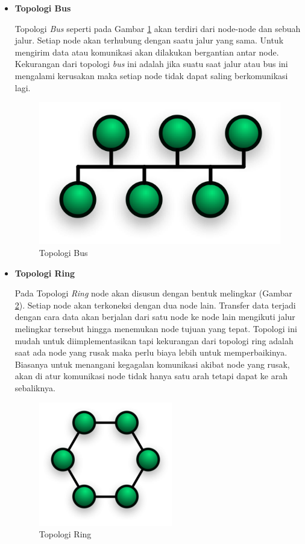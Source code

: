 \documentclass[a4paper,twoside]{article}
\begin{document}
\begin{enumerate}
\begin{itemize}
\item \textbf{Topologi Bus}

Topologi \textit{Bus} seperti pada Gambar \ref{fig:bus} akan terdiri dari node-node dan sebuah jalur. Setiap node akan terhubung dengan saatu jalur yang sama. Untuk mengirim data atau komunikasi akan dilakukan bergantian antar node. Kekurangan dari topologi \textit{bus} ini adalah jika suatu saat jalur atau bus ini mengalami kerusakan maka setiap node tidak dapat saling berkomunikasi lagi.
\begin{figure} [H]
	\centering  
	\includegraphics[scale=0.2]{Gambar/bus}  
	\caption[Topologi Bus]{Topologi Bus} 
	\label{fig:bus} 
\end{figure} 

\item \textbf{Topologi Ring}

Pada Topologi \textit{Ring} node akan disusun dengan bentuk melingkar (Gambar \ref{fig:ring}). Setiap node akan terkoneksi dengan dua node lain. Transfer data terjadi dengan cara data akan berjalan dari satu node ke node lain mengikuti jalur melingkar tersebut hingga menemukan node tujuan yang tepat. Topologi ini mudah untuk diimplementasikan tapi kekurangan dari topologi ring adalah saat ada node yang rusak maka perlu biaya lebih untuk memperbaikinya. Biasanya untuk menangani kegagalan komunikasi akibat node yang rusak, akan di atur komunikasi node tidak hanya satu arah tetapi dapat ke arah sebaliknya.
\begin{figure} [H]
	\centering  
	\includegraphics[scale=0.3]{Gambar/ring}  
	\caption[Topologi Ring]{Topologi Ring} 
	\label{fig:ring} 
\end{figure} 


\end{itemize}
\end{enumerate}
\end{document}
